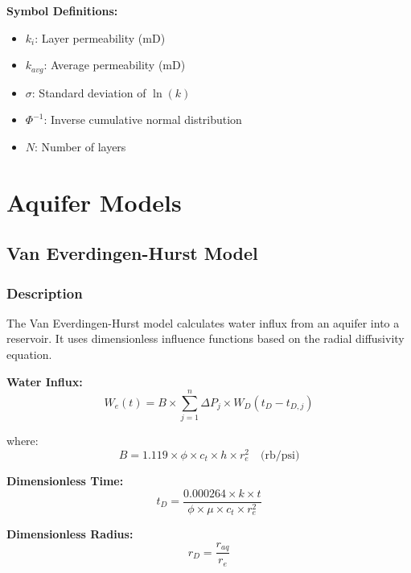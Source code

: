 \documentclass[11pt,a4paper]{article}
\newcommand{\symitem}[2]{\item \textbf{#1}: #2}
\begin{document}
\textbf{Symbol Definitions:}
\begin{itemize}[leftmargin=2cm]
\symitem{$k_i$}{Layer permeability (mD)}
\symitem{$k_{avg}$}{Average permeability (mD)}
\symitem{$\sigma$}{Standard deviation of $\ln(k)$}
\symitem{$\Phi^{-1}$}{Inverse cumulative normal distribution}
\symitem{$N$}{Number of layers}
\end{itemize}

\newpage

\section{Aquifer Models}

\subsection{Van Everdingen-Hurst Model}

\subsubsection{Description}
The Van Everdingen-Hurst model calculates water influx from an aquifer into a reservoir. It uses dimensionless influence functions based on the radial diffusivity equation.

\begin{tcolorbox}[colback=formulabox,colframe=black!75]
\textbf{Water Influx:}
\begin{equation}
W_e(t) = B \times \sum_{j=1}^{n} \Delta P_j \times W_D(t_D - t_{D,j})
\end{equation}

where:
\begin{equation}
B = 1.119 \times \phi \times c_t \times h \times r_e^2 \quad \text{(rb/psi)}
\end{equation}

\textbf{Dimensionless Time:}
\begin{equation}
t_D = \frac{0.000264 \times k \times t}{\phi \times \mu \times c_t \times r_e^2}
\end{equation}

\textbf{Dimensionless Radius:}
\begin{equation}
r_D = \frac{r_{aq}}{r_e}
\end{equation}
\end{tcolorbox}
\end{document}
